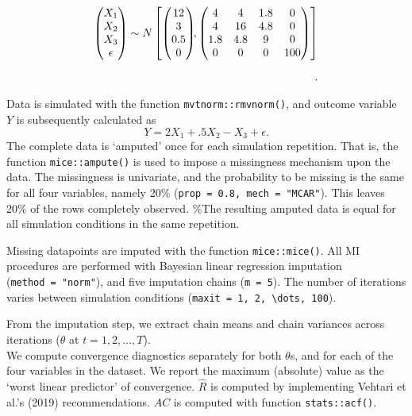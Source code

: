 \documentclass[
  Royal, times, sageapa]{sagej}
\begin{document}
\begin{align*}
\begin{pmatrix}X_1\\
X_2\\
X_3\\
\epsilon
\end{pmatrix} \sim  N
\begin{bmatrix}
\begin{pmatrix}
12\\
3\\
0.5\\
0
\end{pmatrix}\!\!,
\begin{pmatrix}
4 & 4 & 1.8 & 0\\
4 & 16 & 4.8 & 0\\
1.8 & 4.8 & 9 & 0\\
0 & 0 & 0 & 100
\end{pmatrix}
\end{bmatrix}\\[2\jot].
\end{align*}

Data is simulated with the function \texttt{mvtnorm::rmvnorm()}, and
outcome variable \(Y\) is subsequently calculated as
\[Y =  2X_1 + .5X_2 - X_3 + \epsilon .\] The complete data is `amputed'
once for each simulation repetition. That is, the function
\texttt{mice::ampute()} is used to impose a missingness mechanism upon
the data. The missingness is univariate, and the probability to be
missing is the same for all four variables, namely 20\%
(\texttt{prop\ =\ 0.8,\ mech\ =\ "MCAR"}). This leaves 20\% of the rows
completely observed. \%The resulting amputed data is equal for all
simulation conditions in the same repetition.

Missing datapoints are imputed with the function \texttt{mice::mice()}.
All MI procedures are performed with Bayesian linear regression
imputation (\texttt{method\ =\ "norm"}), and five imputation chains
(\texttt{m\ =\ 5}). The number of iterations varies between simulation
conditions (\texttt{maxit\ =\ 1,\ 2,\ \textbackslash{}dots,\ 100}).

From the imputation step, we extract chain means and chain variances
across iterations (\(\theta\) at \(t = 1,2,\dots,T\)).\\
We compute convergence diagnostics separately for both \(\theta\)s, and
for each of the four variables in the dataset. We report the maximum
(absolute) value as the `worst linear predictor' of convergence.
\(\widehat{R}\) is computed by implementing Vehtari et al.'s (2019)
recommendations. \(AC\) is computed with function \texttt{stats::acf()}.
\end{document}
